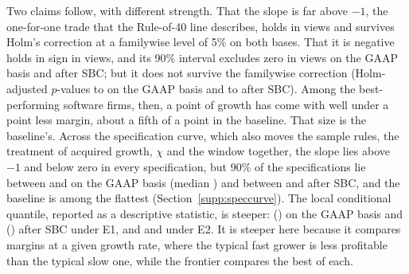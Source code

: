 Two claims follow, with different strength. That the slope is far above $-1$, the one-for-one trade that the Rule-of-40 line describes, holds in \PsiOpCountAbove{} views and survives Holm's correction at a familywise level of 5\% on both bases. That it is negative holds in sign in \PsiOpSignNeg{} views, and its 90\% interval excludes zero in \PsiOpCountNeg{} views on the GAAP basis and \PsiCashCountNeg{} after SBC; but it does not survive the familywise correction (Holm-adjusted $p$-values \HolmPsiOpZeroLo{} to \HolmPsiOpZeroHi{} on the GAAP basis and \HolmPsiCashZeroLo{} to \HolmPsiCashZeroHi{} after SBC). Among the best-performing software firms, then, a point of growth has come with well under a point less margin, about a fifth of a point in the baseline. That size is the baseline's. Across the specification curve, which also moves the sample rules, the treatment of acquired growth, $\chi$ and the window together, the slope lies above $-1$ and below zero in every specification, but 90\% of the specifications lie between \ScPsiOpPLo{} and \ScPsiOpPHi{} on the GAAP basis (median \ScPsiOpMed) and between \ScPsiCashPLo{} and \ScPsiCashPHi{} after SBC, and the baseline is among the flattest (Section~\ref{supp:speccurve}). The local conditional quantile, reported as a descriptive statistic, is steeper: \LocOpEone{} (\LocOpEoneSe) on the GAAP basis and \LocCashEone{} (\LocCashEoneSe) after SBC under E1, and \LocOpEtwo{} and \LocCashEtwo{} under E2. It is steeper here because it compares margins at a given growth rate, where the typical fast grower is less profitable than the typical slow one, while the frontier compares the best of each.

